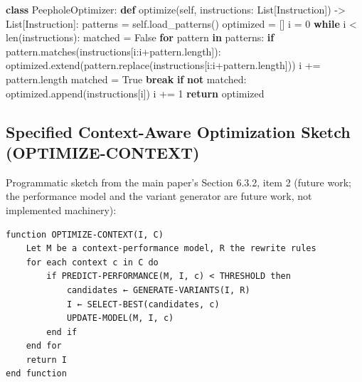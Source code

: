 \documentclass[
  11pt,
]{article}
\newenvironment{Shaded}{}{}
\newcommand{\BuiltInTok}[1]{\textcolor[rgb]{0.00,0.50,0.00}{#1}}
\newcommand{\ControlFlowTok}[1]{\textcolor[rgb]{0.00,0.44,0.13}{\textbf{#1}}}
\newcommand{\DecValTok}[1]{\textcolor[rgb]{0.25,0.63,0.44}{#1}}
\newcommand{\KeywordTok}[1]{\textcolor[rgb]{0.00,0.44,0.13}{\textbf{#1}}}
\newcommand{\NormalTok}[1]{#1}
\newcommand{\OperatorTok}[1]{\textcolor[rgb]{0.40,0.40,0.40}{#1}}
\newcommand{\VariableTok}[1]{\textcolor[rgb]{0.10,0.09,0.49}{#1}}
\begin{document}
\begin{Shaded}
\begin{Highlighting}[]
\KeywordTok{class}\NormalTok{ PeepholeOptimizer:}
    \KeywordTok{def}\NormalTok{ optimize(}\VariableTok{self}\NormalTok{, instructions: List[Instruction]) }\OperatorTok{{-}\textgreater{}}\NormalTok{ List[Instruction]:}
\NormalTok{        patterns }\OperatorTok{=} \VariableTok{self}\NormalTok{.load\_patterns()}
\NormalTok{        optimized }\OperatorTok{=}\NormalTok{ []}
\NormalTok{        i }\OperatorTok{=} \DecValTok{0}
        \ControlFlowTok{while}\NormalTok{ i }\OperatorTok{\textless{}} \BuiltInTok{len}\NormalTok{(instructions):}
\NormalTok{            matched }\OperatorTok{=} \VariableTok{False}
            \ControlFlowTok{for}\NormalTok{ pattern }\KeywordTok{in}\NormalTok{ patterns:}
                \ControlFlowTok{if}\NormalTok{ pattern.matches(instructions[i:i}\OperatorTok{+}\NormalTok{pattern.length]):}
\NormalTok{                    optimized.extend(pattern.replace(instructions[i:i}\OperatorTok{+}\NormalTok{pattern.length]))}
\NormalTok{                    i }\OperatorTok{+=}\NormalTok{ pattern.length}
\NormalTok{                    matched }\OperatorTok{=} \VariableTok{True}
                    \ControlFlowTok{break}
            \ControlFlowTok{if} \KeywordTok{not}\NormalTok{ matched:}
\NormalTok{                optimized.append(instructions[i])}
\NormalTok{                i }\OperatorTok{+=} \DecValTok{1}
        \ControlFlowTok{return}\NormalTok{ optimized}
\end{Highlighting}
\end{Shaded}

\subsection{Specified Context-Aware Optimization Sketch
(OPTIMIZE-CONTEXT)}\label{specified-context-aware-optimization-sketch-optimize-context}

Programmatic sketch from the main paper's Section 6.3.2, item 2 (future
work; the performance model and the variant generator are future work,
not implemented machinery):

\begin{verbatim}
function OPTIMIZE-CONTEXT(I, C)
    Let M be a context-performance model, R the rewrite rules
    for each context c in C do
        if PREDICT-PERFORMANCE(M, I, c) < THRESHOLD then
            candidates ← GENERATE-VARIANTS(I, R)
            I ← SELECT-BEST(candidates, c)
            UPDATE-MODEL(M, I, c)
        end if
    end for
    return I
end function
\end{verbatim}
\end{document}
